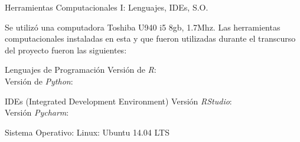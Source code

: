 \documentclass{bredelebeamer}
\begin{document}

\begin{frame}{Herramientas Computacionales I: Lenguajes, IDEs, S.O.}

Se utiliz\'o una computadora Toshiba U940 i5 8gb, 1.7Mhz. Las herramientas computacionales
instaladas en esta y que fueron utilizadas durante el transcurso del proyecto fueron las
siguientes:

\begin{block}{Lenguajes de Programaci\'on}
Versi\'on de \textit{R}: \\
Versi\'on de \textit{Python}:
\end{block}

\begin{block}{IDEs (Integrated Development Environment)}
Versi\'on \textit{RStudio}: \\
Versi\'on \textit{Pycharm}:
\end{block}

\begin{block}{Sistema Operativo:}
Linux: Ubuntu 14.04 LTS
\end{block}

\end{frame}

\end{document}
